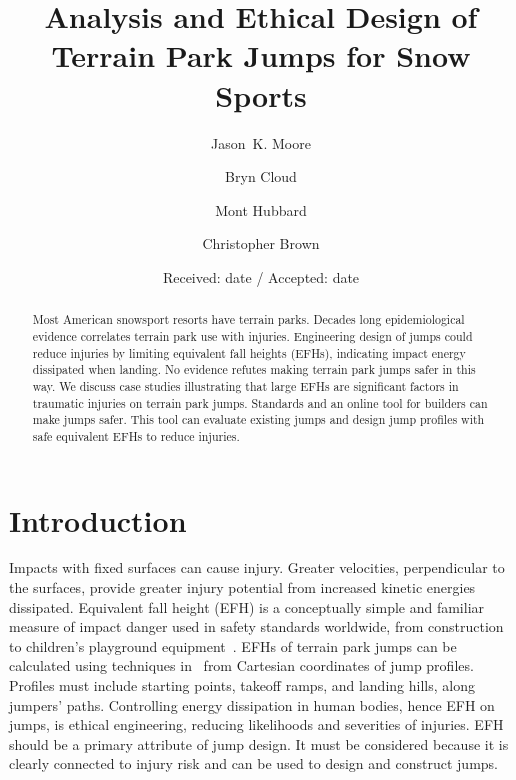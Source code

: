 \documentclass[smallextended]{svjour3}       %
\begin{document}
\title{Analysis and Ethical Design of Terrain Park Jumps for Snow Sports}

\author{
  Jason~K. Moore \and
  Bryn Cloud \and
  Mont Hubbard \and
  Christopher Brown
}


\date{Received: date / Accepted: date}

\maketitle

\begin{abstract}
  Most American snowsport resorts have terrain parks. Decades long
  epidemiological evidence correlates terrain park use with injuries.
  Engineering design of jumps could reduce injuries by limiting equivalent fall
  heights (EFHs), indicating impact energy dissipated when landing. No evidence
  refutes  making terrain park jumps safer in this way. We discuss case studies
  illustrating that large EFHs are significant factors in traumatic injuries on
  terrain park jumps. Standards and an online tool for builders can make jumps
  safer. This tool can evaluate existing jumps and design jump profiles with
  safe equivalent EFHs to reduce injuries.
\end{abstract}

\section{Introduction}
\label{intro}
%
Impacts with fixed surfaces can cause injury. Greater velocities,
perpendicular to the surfaces, provide greater injury potential from
increased kinetic energies dissipated. Equivalent fall height (EFH) is a
conceptually simple and familiar measure of impact danger used in safety
standards worldwide, from construction~\cite{OSHA2021} to children's playground
equipment~\cite{Chalmers1996}. EFHs of terrain park jumps can be calculated
using techniques in~\cite{Hubbard2009} from Cartesian coordinates of jump
profiles. Profiles must include starting points, takeoff ramps, and landing
hills, along jumpers' paths. Controlling energy dissipation in human bodies,
hence EFH on jumps, is ethical engineering, reducing likelihoods and severities
of injuries. EFH should be a primary attribute of jump design. It must be
considered because it is clearly connected to injury risk and can  be used
 to design and construct jumps.
\end{document}

